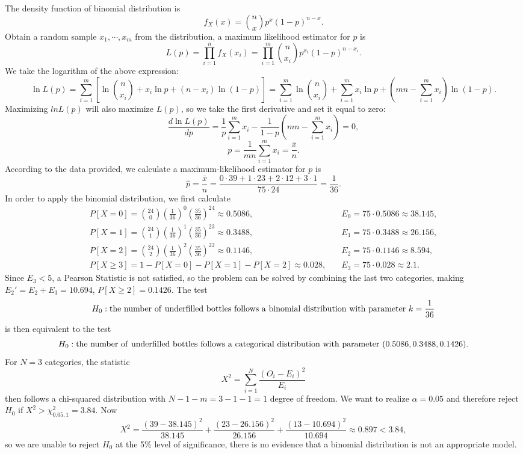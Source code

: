 \documentclass[11pt,a4paper]{article}
\begin{document}
\subsection{}
The density function of binomial distribution is
$$f_X(x)=\binom{n}{x}p^x(1-p)^{n-x}.$$
Obtain a random sample $x_1,\cdots,x_m$ from the distribution, a maximum likelihood estimator for $p$ is
$$L(p)=\prod_{i=1}^n f_X(x_i)=\prod_{i=1}^m\binom{n}{x_i}p^{x_i}(1-p)^{n-{x_i}}.$$
We take the logarithm of the above expression:
$$\ln L(p)=\sum_{i=1}^m\left[\ln\binom{n}{x_i}+x_i\ln p+(n-x_i)\ln(1-p)\right]=\sum_{i=1}^m\ln\binom{n}{x_i}+\sum_{i=1}^mx_i\ln p+\left(mn-\sum_{i=1}^mx_i\right)\ln(1-p).$$
Maximizing $ln L(p)$ will also maximize $L(p)$, so we take the first derivative and set it equal to zero:
$$\frac{d\ln L(p)}{dp}=\frac{1}{p}\sum_{i=1}^mx_i-\frac{1}{1-p}\left(mn-\sum_{i=1}^mx_i\right)=0,$$
$$p=\frac{1}{mn}\sum_{i=1}^mx_i=\frac{\overline{x}}{n}.$$
According to the data provided, we calculate a maximum-likelihood estimator for $p$ is
$$\hat{p}=\frac{\overline{x}}{n}=\frac{0\cdot39+1\cdot23+2\cdot12+3\cdot1}{75\cdot24}=\frac{1}{36}.$$
In order to apply the binomial distribution, we first calculate
\begin{align*}
P[X=0]=\binom{24}{0}\left(\frac{1}{36}\right)^0\left(\frac{35}{36}\right)^{24}\approx0.5086,\quad & E_0=75\cdot0.5086\approx38.145,\\
P[X=1]=\binom{24}{1}\left(\frac{1}{36}\right)^1\left(\frac{35}{36}\right)^{23}\approx0.3488,\quad & E_1=75\cdot0.3488\approx26.156,\\
P[X=2]=\binom{24}{2}\left(\frac{1}{36}\right)^2\left(\frac{35}{36}\right)^{22}\approx0.1146,\quad & E_2=75\cdot0.1146\approx8.594,\\
P[X\geqslant3]=1-P[X=0]-P[X=1]-P[X=2]\approx0.028,\quad & E_3=75\cdot0.028\approx2.1.
\end{align*}
Since $E_3<5$, a Pearson Statistic is not satisfied, so the problem can be solved by combining the last two categories, making $E_2'=E_2+E_3=10.694$, $P[X\geqslant 2]=0.1426$. The test
$$H_0: {\rm the\ number\ of\ underfilled\ bottles\ follows\ a\ binomial\ distribution\ with\ parameter\ } k=\frac{1}{36}$$
is then equivalent to the test
$$H_0: {\rm the\ number\ of\ underfilled\ bottles\ follows\ a\ categorical\ distribution\ with\ parameter\ } (0.5086,0.3488,0.1426).$$
For $N = 3$ categories, the statistic 
$$X^2=\sum_{i=1}^N\frac{(O_i-E_i)^2}{E_i}$$
then follows a chi-squared distribution with $N-1-m=3-1-1=1$ degree of freedom. We want to realize $\alpha = 0.05$ and therefore reject $H_0$ if $X^2 > \chi^2_{0.05,1} = 3.84$. Now
$$X^2=\frac{(39-38.145)^2}{38.145}+\frac{(23-26.156)^2}{26.156}+\frac{(13-10.694)^2}{10.694}\approx0.897<3.84,$$
so we are unable to reject $H_0$ at the 5\% level of significance, there is no evidence that a binomial distribution is not an appropriate model.
\end{document}
